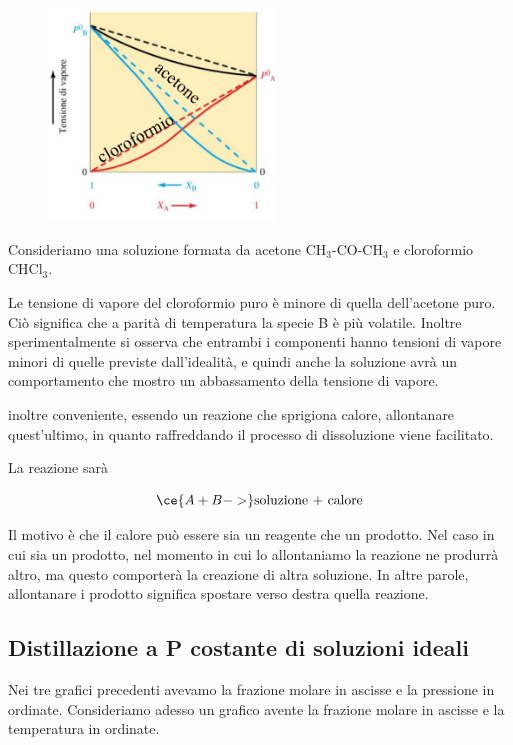 \vspace{-0.2cm}\begin{minipage}{0.4\textwidth}
    \begin{figure}[H]
        \includegraphics[width=6cm]{immagini/tensione_di_vapore_sol_esotermica.png}
    \end{figure}
\end{minipage}
\begin{minipage}{0.6\textwidth}
    Consideriamo una soluzione formata da acetone CH$_3$-CO-CH$_3$ e cloroformio CHCl$_3$.

    Le tensione di vapore del cloroformio puro è minore di quella dell'acetone puro. Ciò significa che a parità di temperatura la specie B è più volatile. Inoltre sperimentalmente si osserva che entrambi i componenti hanno tensioni di vapore minori di quelle previste dall'idealità, e quindi anche la soluzione avrà un comportamento che mostro un abbassamento della tensione di vapore.
\end{minipage}
\E inoltre conveniente, essendo un reazione che sprigiona calore, allontanare quest'ultimo, in quanto raffreddando il processo di dissoluzione viene facilitato.

La reazione sarà

$$\ce{A + B ->} \text{soluzione + calore}$$

Il motivo è che il calore può essere sia un reagente che un prodotto. Nel caso in cui sia un prodotto, nel momento in cui lo allontaniamo la reazione ne produrrà altro, ma questo comporterà la creazione di altra soluzione. In altre parole, allontanare i prodotto significa spostare verso destra quella reazione.
\subsection{Distillazione a P costante di soluzioni ideali}
Nei tre grafici precedenti avevamo la frazione molare in ascisse e la pressione in ordinate. Consideriamo adesso un grafico avente la frazione molare in ascisse e la temperatura in ordinate.

